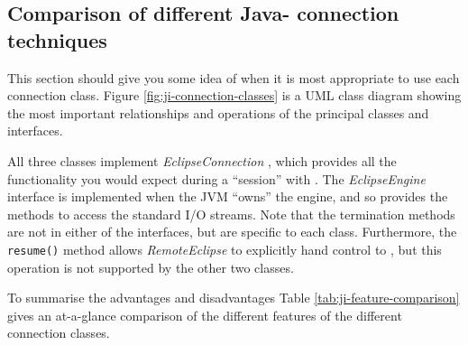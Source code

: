 \subsection{Comparison of different Java-{\eclipse} connection techniques}
\label{sec:ji-compare-connection-classes}
This section should give you some idea of when it is most appropriate
to use each connection class. Figure \ref{fig:ji-connection-classes}
is a UML class diagram showing the most important relationships and
operations of the principal classes and interfaces. 

All three classes implement {\it EclipseConnection}
, which provides all the functionality
you would expect during a ``session'' with {\eclipse}. The {\it
EclipseEngine} interface  is implemented
when the JVM ``owns'' the {\eclipse} engine, and so provides the methods to
access the standard I/O streams. Note that the termination methods are not
in either of the interfaces, but are specific to each class. Furthermore,
the {\tt resume()} method allows {\it RemoteEclipse} to explicitly hand
control to {\eclipse}, but this operation is not supported by the other two
classes.

To summarise the advantages and disadvantages Table
\ref{tab:ji-feature-comparison} gives an at-a-glance comparison of the
different features of the different connection
classes.

